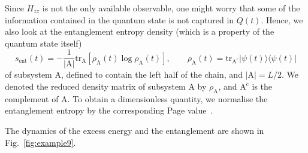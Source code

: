 \documentclass{SciPost}
\newcommand\0{\scalebox{-1}[1]{0}}
\begin{document}
Since $H_{zz}$ is not the only available observable, one might worry that some of the information contained in the quantum state is not captured in $Q(t)$. Hence, we also look at the entanglement entropy density (which is a property of the quantum state itself)
\begin{equation}
s_\mathrm{ent}(t) = -\frac{1}{|\mathrm{A}|}\mathrm{tr}_{\mathrm{A}}\left[\rho_\mathrm{A}(t)\log\rho_\mathrm{A}(t)\right], \qquad \rho_\mathrm{A}(t) = \mathrm{tr}_{\mathrm{A^c}} |\psi(t)\rangle\langle\psi(t)|
\end{equation}
of subsystem A, defined to contain the left half of the chain, and $|\mathrm{A}|=L/2$. We denoted the reduced density matrix of subsystem A by $\rho_\mathrm{A}$, and $\mathrm{A^c}$ is the complement of A. To obtain a dimensionless quantity, we normalise the entanglement entropy by the corresponding Page value~\cite{page_93}.

The dynamics of the excess energy and the entanglement are shown in Fig.~\ref{fig:example9}. 
\end{document}
